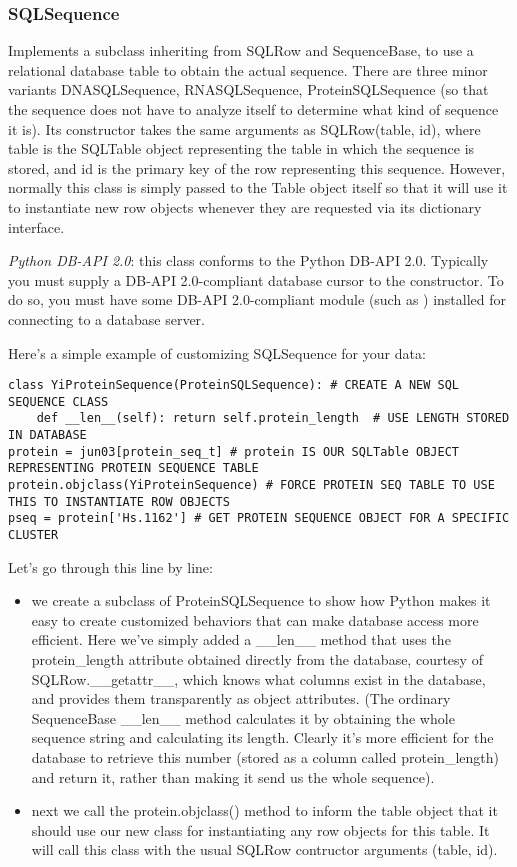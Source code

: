 \documentclass{howto}
\begin{document}
\subsubsection{SQLSequence}

Implements a subclass inheriting from SQLRow and SequenceBase, to use a relational database table to obtain the actual sequence.  There are three minor variants DNASQLSequence, RNASQLSequence, ProteinSQLSequence (so that the sequence does not have to analyze itself to determine what kind of sequence it is).  Its constructor takes the same arguments as SQLRow(table, id), where table is the SQLTable object representing the table in which the sequence is stored, and id is the primary key of the row representing this sequence.  However, normally this class is simply passed to the Table object itself so that it will use it to instantiate new row objects whenever they are requested via its dictionary interface.  

{\em Python DB-API 2.0}: this class conforms to the Python DB-API 2.0.
Typically you must supply a DB-API 2.0-compliant database cursor to the 
 constructor.  To do so, you must have some DB-API 2.0-compliant
module (such as ) installed for connecting to a database server.

Here's a simple example of customizing SQLSequence for your data:

\begin{verbatim}
class YiProteinSequence(ProteinSQLSequence): # CREATE A NEW SQL SEQUENCE CLASS
    def __len__(self): return self.protein_length  # USE LENGTH STORED IN DATABASE
protein = jun03[protein_seq_t] # protein IS OUR SQLTable OBJECT REPRESENTING PROTEIN SEQUENCE TABLE
protein.objclass(YiProteinSequence) # FORCE PROTEIN SEQ TABLE TO USE THIS TO INSTANTIATE ROW OBJECTS
pseq = protein['Hs.1162'] # GET PROTEIN SEQUENCE OBJECT FOR A SPECIFIC CLUSTER
\end{verbatim}

Let's go through this line by line:

\begin{itemize}

\item
we create a subclass of ProteinSQLSequence to show how Python makes it easy to create customized behaviors that can make database access more efficient.  Here we've simply added a __len__ method that uses the protein_length attribute obtained directly from the database, courtesy of SQLRow.__getattr__, which knows what columns exist in the database, and provides them transparently as object attributes.  (The ordinary SequenceBase __len__ method calculates it by obtaining the whole sequence string and calculating its length.  Clearly it's more efficient for the database to retrieve this number (stored as a column called protein_length) and return it, rather than making it send us the whole sequence).

\item
next we call the protein.objclass() method to inform the table object that it should use our new class for instantiating any row objects for this table.  It will call this class with the usual SQLRow contructor arguments (table, id).
\end{itemize}
\end{document}
